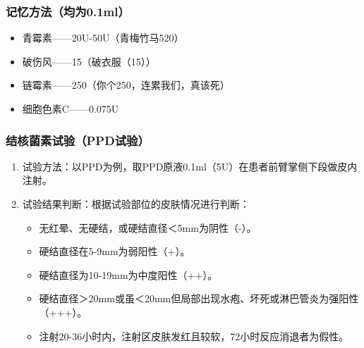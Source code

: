 \documentclass[11pt, a4paper]{ctexart}
\begin{document}
\subsubsection{记忆方法（均为0.1ml）}
\begin{itemize}
	\item 青霉素——20U-50U（青梅竹马520）
	\item 破伤风——15（破衣服（15））
	\item 链霉素——250（你个250，连累我们，真该死）
	\item 细胞色素C——0.075U
\end{itemize}

\subsubsection{结核菌素试验（PPD试验）}
\begin{enumerate}
	\item 试验方法：以PPD为例，取PPD原液0.1ml（5U）在患者前臂掌侧下段做皮内注射。
	\item 试验结果判断：根据试验部位的皮肤情况进行判断：
	      \begin{itemize}
		      \item 无红晕、无硬结，或硬结直径＜5mm为阴性（-）。
		      \item 硬结直径在5-9mm为弱阳性（+）。
		      \item 硬结直径为10-19mm为中度阳性（++）。
		      \item 硬结直径＞20mm或虽＜20mm但局部出现水疱、坏死或淋巴管炎为强阳性（+++）。
		      \item 注射20-36小时内，注射区皮肤发红且较软，72小时反应消退者为假性。
	      \end{itemize}
\end{enumerate}
\end{document}
